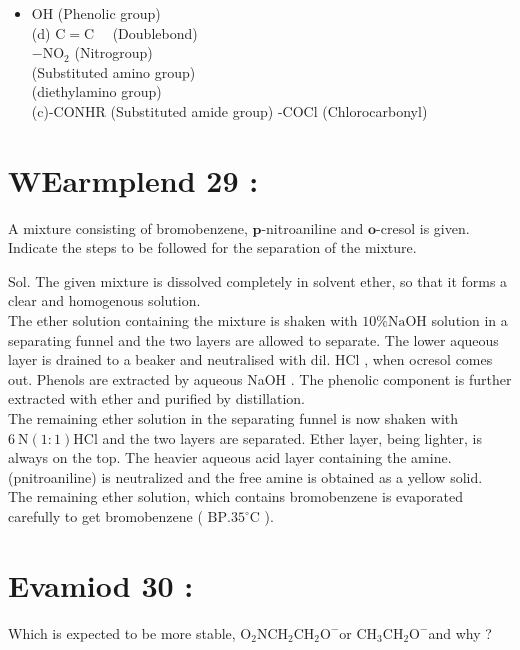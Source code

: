 \documentclass[10pt]{article}
\begin{document}
\begin{itemize}
  \item OH (Phenolic group)\\
(d) $\mathrm{C}=\mathrm{C} \quad$ (Doublebond)\\
$-\mathrm{NO}_{2}$ (Nitrogroup)\\
(Substituted amino group)\\
(diethylamino group)\\
(c)-CONHR (Substituted amide group) -COCl (Chlorocarbonyl)
\end{itemize}

\section*{WEarmplend 29 :}
A mixture consisting of bromobenzene, $\boldsymbol{p}$-nitroaniline and $\boldsymbol{o}$-cresol is given. Indicate the steps to be followed for the separation of the mixture.

Sol. The given mixture is dissolved completely in solvent ether, so that it forms a clear and homogenous solution.\\
The ether solution containing the mixture is shaken with $10 \% \mathrm{NaOH}$ solution in a separating funnel and the two layers are allowed to separate. The lower aqueous layer is drained to a beaker and neutralised with dil. HCl , when ocresol comes out. Phenols are extracted by aqueous NaOH . The phenolic component is further extracted with ether and purified by distillation.\\
The remaining ether solution in the separating funnel is now shaken with $6 \mathrm{~N}(1: 1) \mathrm{HCl}$ and the two layers are separated. Ether layer, being lighter, is always on the top. The heavier aqueous acid layer containing the amine. (pnitroaniline) is neutralized and the free amine is obtained as a yellow solid.\\
The remaining ether solution, which contains bromobenzene is evaporated carefully to get bromobenzene ( $\mathrm{BP} .35^{\circ} \mathrm{C}$ ).

\section*{Evamiod 30 :}
Which is expected to be more stable, $\mathrm{O}_{2} \mathrm{NCH}_{2} \mathrm{CH}_{2} \mathrm{O}^{-}$or $\mathrm{CH}_{3} \mathrm{CH}_{2} \mathrm{O}^{-}$and why ?
\end{document}
